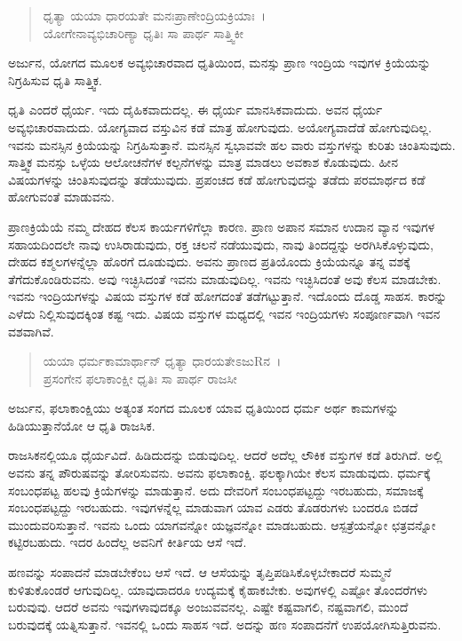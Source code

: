 \begin{verse}
ಧೃತ್ಯಾ ಯಯಾ ಧಾರಯತೇ ಮನಃಪ್ರಾಣೇಂದ್ರಿಯಕ್ರಿಯಾಃ~।\\ಯೋಗೇನಾವ್ಯಭಿಚಾರಿಣ್ಯಾ ಧೃತಿಃ ಸಾ ಪಾರ್ಥ ಸಾತ್ತ್ವಿಕೀ 
\end{verse}

{\small ಅರ್ಜುನ, ಯೋಗದ ಮೂಲಕ ಅವ್ಯಭಿಚಾರವಾದ ಧೃತಿಯಿಂದ, ಮನಸ್ಸು ಪ್ರಾಣ ಇಂದ್ರಿಯ ಇವುಗಳ ಕ್ರಿಯೆಯನ್ನು ನಿಗ್ರಹಿಸುವ ಧೃತಿ ಸಾತ್ತ್ವಿಕ.}

ಧೃತಿ ಎಂದರೆ ಧೈರ್ಯ. ಇದು ದೈಹಿಕವಾದುದಲ್ಲ. ಈ ಧೈರ್ಯ ಮಾನಸಿಕವಾದುದು. ಅವನ ಧೈರ್ಯ ಅವ್ಯಭಿಚಾರವಾದುದು. ಯೋಗ್ಯವಾದ ವಸ್ತುವಿನ ಕಡೆ ಮಾತ್ರ ಹೋಗುವುದು. ಅಯೋಗ್ಯವಾದೆಡೆ ಹೋಗುವುದಿಲ್ಲ. ಇವನು ಮನಸ್ಸಿನ ಕ್ರಿಯೆಯನ್ನು ನಿಗ್ರಹಿಸುತ್ತಾನೆ. ಮನಸ್ಸಿನ ಸ್ವಭಾವವೇ ಹಲ ವಾರು ವಸ್ತುಗಳನ್ನು ಕುರಿತು ಚಿಂತಿಸುವುದು. ಸಾತ್ತ್ವಿಕ ಮನಸ್ಸು ಒಳ್ಳೆಯ ಆಲೋಚನೆಗಳ ಕಲ್ಪನೆಗಳನ್ನು ಮಾತ್ರ ಮಾಡಲು ಅವಕಾಶ ಕೊಡುವುದು. ಹೀನ ವಿಷಯಗಳನ್ನು ಚಿಂತಿಸುವುದನ್ನು ತಡೆಯುವುದು. ಪ್ರಪಂಚದ ಕಡೆ ಹೋಗುವುದನ್ನು ತಡೆದು ಪರಮಾರ್ಥದ ಕಡೆ ಹೋಗುವಂತೆ ಮಾಡುವನು. 

ಪ್ರಾಣಕ್ರಿಯೆಯೆ ನಮ್ಮ ದೇಹದ ಕೆಲಸ ಕಾರ್ಯಗಳಿಗೆಲ್ಲಾ ಕಾರಣ. ಪ್ರಾಣ ಅಪಾನ ಸಮಾನ ಉದಾನ ವ್ಯಾನ ಇವುಗಳ ಸಹಾಯದಿಂದಲೇ ನಾವು ಉಸಿರಾಡುವುದು, ರಕ್ತ ಚಲನೆ ನಡೆಯುವುದು, ನಾವು ತಿಂದದ್ದನ್ನು ಅರಗಿಸಿಕೊಳ್ಳುವುದು, ದೇಹದ ಕಶ್ಮಲಗಳನ್ನೆಲ್ಲಾ ಹೊರಗೆ ದೂಡುವುದು. ಅವನು ಪ್ರಾಣದ ಪ್ರತಿಯೊಂದು ಕ್ರಿಯೆಯನ್ನೂ ತನ್ನ ವಶಕ್ಕೆ ತೆಗೆದುಕೊಂಡಿರುವನು. ಅವು ಇಚ್ಛಿಸಿದಂತೆ ಇವನು ಮಾಡುವುದಿಲ್ಲ. ಇವನು ಇಚ್ಛಿಸಿದಂತೆ ಅವು ಕೆಲಸ ಮಾಡಬೇಕು. ಇವನು ಇಂದ್ರಿಯಗಳನ್ನು ವಿಷಯ ವಸ್ತುಗಳ ಕಡೆ ಹೋಗದಂತೆ ತಡೆಗಟ್ಟುತ್ತಾನೆ. ಇದೊಂದು ದೊಡ್ಡ ಸಾಹಸ. ಕಾರನ್ನು ಎಳೆದು ನಿಲ್ಲಿಸುವುದಕ್ಕಿಂತ ಕಷ್ಟ ಇದು. ವಿಷಯ ವಸ್ತುಗಳ ಮಧ್ಯದಲ್ಲಿ ಇವನ ಇಂದ್ರಿಯಗಳು ಸಂಪೂರ್ಣವಾಗಿ ಇವನ ವಶವಾಗಿವೆ.

\begin{verse}
ಯಯಾ ಧರ್ಮಕಾಮಾರ್ಥಾನ್ ಧೃತ್ಯಾ ಧಾರಯತೇಽಜುRನ~।\\ಪ್ರಸಂಗೇನ ಫಲಾಕಾಂಕ್ಷೀ ಧೃತಿಃ ಸಾ ಪಾರ್ಥ ರಾಜಸೀ 
\end{verse}

{\small ಅರ್ಜುನ, ಫಲಾಕಾಂಕ್ಷಿಯು ಅತ್ಯಂತ ಸಂಗದ ಮೂಲಕ ಯಾವ ಧೃತಿಯಿಂದ ಧರ್ಮ ಅರ್ಥ ಕಾಮಗಳನ್ನು ಹಿಡಿಯುತ್ತಾನೆಯೋ ಆ ಧೃತಿ ರಾಜಸಿಕ.}

ರಾಜಸಿಕನಲ್ಲಿಯೂ ಧೈರ್ಯವಿದೆ. ಹಿಡಿದುದನ್ನು ಬಿಡುವುದಿಲ್ಲ. ಆದರೆ ಅದೆಲ್ಲ ಲೌಕಿಕ ವಸ್ತುಗಳ ಕಡೆ ತಿರುಗಿದೆ. ಅಲ್ಲಿ ಅವನು ತನ್ನ ಪೌರುಷವನ್ನು ತೋರಿಸುವನು. ಅವನು ಫಲಾಕಾಂಕ್ಷಿ. ಫಲಕ್ಕಾಗಿಯೇ ಕೆಲಸ ಮಾಡುವುದು. ಧರ್ಮಕ್ಕೆ ಸಂಬಂಧಪಟ್ಟ ಹಲವು ಕ್ರಿಯೆಗಳನ್ನು ಮಾಡುತ್ತಾನೆ. ಅದು ದೇವರಿಗೆ ಸಂಬಂಧಪಟ್ಟದ್ದು ಇರಬಹುದು, ಸಮಾಜಕ್ಕೆ ಸಂಬಂಧಪಟ್ಟದ್ದು ಇರಬಹುದು. ಇವುಗಳನ್ನೆಲ್ಲ ಮಾಡುವಾಗ ಯಾವ ಎಡರು ತೊಡರುಗಳು ಬಂದರೂ ಬಿಡದೆ ಮುಂದುವರಿಸುತ್ತಾನೆ. ಇವನು ಒಂದು ಯಾಗವನ್ನೋ ಯಜ್ಞವನ್ನೋ ಮಾಡಬಹುದು. ಆಸ್ಪತ್ರೆಯನ್ನೋ ಛತ್ರವನ್ನೋ ಕಟ್ಟಿರಬಹುದು. ಇದರ ಹಿಂದೆಲ್ಲ ಅವನಿಗೆ ಕೀರ್ತಿಯ ಆಸೆ ಇದೆ.

ಹಣವನ್ನು ಸಂಪಾದನೆ ಮಾಡಬೇಕೆಂಬ ಆಸೆ ಇದೆ. ಆ ಆಸೆಯನ್ನು ತೃಪ್ತಿಪಡಿಸಿಕೊಳ್ಳಬೇಕಾದರೆ ಸುಮ್ಮನೆ ಕುಳಿತುಕೊಂಡರೆ ಆಗುವುದಿಲ್ಲ. ಯಾವುದಾದರೂ ಉದ್ಯಮಕ್ಕೆ ಕೈಹಾಕಬೇಕು. ಅವುಗಳಲ್ಲಿ ಎಷ್ಟೋ ತೊಂದರೆಗಳು ಬರುವುವು. ಆದರೆ ಅವನು ಇವುಗಳಾವುದಕ್ಕೂ ಅಂಜುವವನಲ್ಲ. ಎಷ್ಟೇ ಕಷ್ಟವಾಗಲಿ, ನಷ್ಟವಾಗಲಿ, ಮುಂದೆ ಬರುವುದಕ್ಕೆ ಯತ್ನಿಸುತ್ತಾನೆ. ಇವನಲ್ಲಿ ಒಂದು ಸಾಹಸ ಇದೆ. ಅದನ್ನು ಹಣ ಸಂಪಾದನೆಗೆ ಉಪಯೋಗಿಸುತ್ತಿರುವನು.

